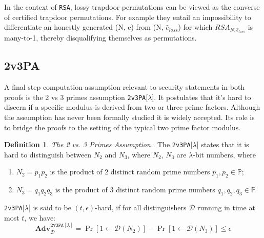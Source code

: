 \documentclass[]{final_report}
\theoremstyle{definition}
\newtheorem{definition}{Definition}[chapter]
\begin{document}
In the context of \texttt{RSA}, lossy trapdoor permutations can be viewed as the converse of certified trapdoor permutations. For example they entail an impossibility to differentiate an honestly generated (N, e) from (N, $\hat{e}_{loss}$) for which $RSA_{N, \hat{e}_{loss}}$ is many-to-1, thereby disqualifying themselves as permutations.


\subsection{2v3PA}
A final step computation assumption relevant to security statements in both proofs is the 2 vs 3 primes assumption \texttt{2v3PA}[$\lambda$]. It postulates that it's hard to discern if a specific modulus is derived from two or three prime factors. Although the assumption has never been formally studied it is widely accepted. Its role is to bridge the proofs to the setting of the typical two prime factor modulus.

\begin{definition}
\textit{The 2 vs. 3 Primes Assumption} \cite{jager2018security} . The \texttt{2v3PA}[$\lambda$] states that it is hard to distinguish between $N_2$ and $N_3$, where $N_2$, $N_3$ are $\lambda$-bit numbers, where 
\begin{enumerate}
\item $N_2 = p_1 p_2$ is the product of 2 distinct random prime numbers $p_1, p_2 \in \mathbb{P}$; 
\item $N_3 = q_1 q_2 q_3$ is the product of 3 distinct random prime numbers $q_1, q_2, q_3 \in \mathbb{P}$
\end{enumerate}
\texttt{2v3PA}[$\lambda$] is said to be $(t, \epsilon)$-hard, if for all distinguishers $\mathcal{D}$ running in time at most $t$, we have:
\[
\textbf{Adv}^{\texttt{2v3PA}[\lambda]}_\mathcal{D} = \Pr[1 \leftarrow \mathcal{D}(N_2)] - \Pr[1 \leftarrow \mathcal{D}(N_3)] \leqslant \epsilon
\]
\end{definition}
\end{document}

